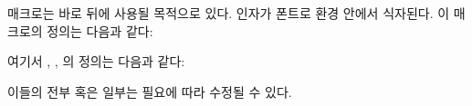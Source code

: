 \begin{syntax}
\cmd{\precisfont} \\
\cmd{\prechapterprecis} \cmd{\postchapterprecis} \\
\end{syntax}
\cmd{\chapterprecishere} 매크로는 \cmd{\chapter} 바로 뒤에 사용될 목적으로 있다.
 인자가 \cmd{\precisfont} 폰트로  환경 안에서 식자된다.
이 매크로의 정의는 다음과 같다:
\begin{lcode}
\newcommand{\chapterprecishere}[1]{%
  \prechapterprecis #1\postchapterprecis}
\end{lcode}
여기서 \cmd{\prechapterprecis}, \cmd{\postchapterprecis}, \cmd{\precisfont}
의 정의는 다음과 같다:
\begin{lcode}
\newcommand{\prechapterprecis}{%
  \vspace*{\prechapterprecisshift}%
  \begin{quote}\precisfont}
\newcommand{\postchapterprecis}{\end{quote}}
\newcommand*{\precisfont}{\normalfont\itshape}
\end{lcode}
이들의 전부 혹은 일부는 필요에 따라 수정될 수 있다.

